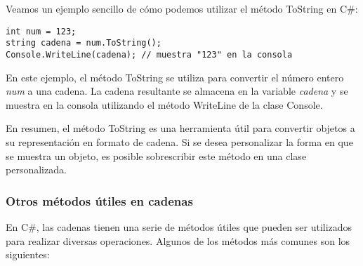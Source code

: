 \documentclass[executivepaper]{article}
\begin{document}
Veamos un ejemplo sencillo de cómo podemos utilizar el método ToString en C\#:

\begin{lstlisting}[language={[Sharp]C}]
int num = 123;
string cadena = num.ToString();
Console.WriteLine(cadena); // muestra "123" en la consola
\end{lstlisting}

En este ejemplo, el método ToString se utiliza para convertir el número entero \emph{num} a una cadena. La cadena resultante se almacena en la variable \emph{cadena} y se muestra en la consola utilizando el método WriteLine de la clase Console.

En resumen, el método ToString es una herramienta útil para convertir objetos a su representación en formato de cadena. Si se desea personalizar la forma en que se muestra un objeto, es posible sobrescribir este método en una clase personalizada.

\subsubsection*{Otros métodos útiles en cadenas}

En C\#, las cadenas tienen una serie de métodos útiles que pueden ser utilizados para realizar diversas operaciones. Algunos de los métodos más comunes son los siguientes:
\end{document}
